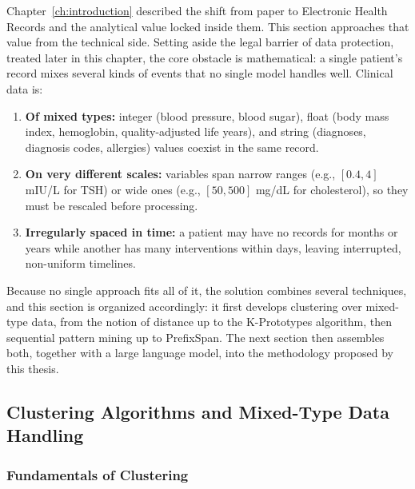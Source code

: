 Chapter~\ref{ch:introduction} described the shift from paper to Electronic Health Records and the analytical value locked inside them. This section approaches that value from the technical side. Setting aside the legal barrier of data protection, treated later in this chapter, the core obstacle is mathematical: a single patient's record mixes several kinds of events that no single model handles well. Clinical data is:

\vspace{0.2em}

\begin{enumerate}

    \item \textbf{Of mixed types:} integer (blood pressure, blood sugar), float (body mass index, hemoglobin, quality-adjusted life years), and string (diagnoses, diagnosis codes, allergies) values coexist in the same record.

    \item \textbf{On very different scales:} variables span narrow ranges (e.g., $[0.4, 4]$ mIU/L for TSH) or wide ones (e.g., $[50, 500]$ mg/dL for cholesterol), so they must be rescaled before processing.

    \item \textbf{Irregularly spaced in time:} a patient may have no records for months or years while another has many interventions within days, leaving interrupted, non-uniform timelines.

\end{enumerate}

\vspace{1em}

Because no single approach fits all of it, the solution combines several techniques, and this section is organized accordingly: it first develops clustering over mixed-type data, from the notion of distance up to the K-Prototypes algorithm, then sequential pattern mining up to PrefixSpan. The next section then assembles both, together with a large language model, into the methodology proposed by this thesis.

\subsection{Clustering Algorithms and Mixed-Type Data Handling}
\label{ch:clustering_limitations}

\subsubsection*{Fundamentals of Clustering}

